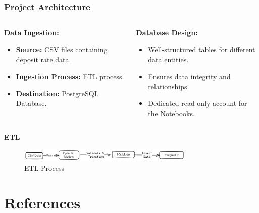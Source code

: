 \documentclass{beamer}
\begin{document}
\begin{frame}
\frametitle{Project Architecture}
 \begin{columns}[t]
    \begin{column}{0.5\textwidth}
      \textbf{Data Ingestion:}

      \begin{itemize}
        \item \textbf{Source:} CSV files containing deposit rate data.
        \item \textbf{Ingestion Process:} ETL process.
        \item \textbf{Destination:} PostgreSQL Database.
      \end{itemize}

      \vspace{1em}

      
    \end{column}

    \begin{column}{0.5\textwidth}
      \textbf{Database Design:}

      \begin{itemize}
        \item Well-structured tables for different data entities.
        \item Ensures data integrity and relationships.
        \item Dedicated read-only account for the Notebooks.
      \end{itemize}
    \end{column}
  \end{columns}

\textbf{ETL}
\begin{figure}
    \centering
    \includegraphics[width=0.75\textwidth]{reports/figures/ingestion_pipline.png}
    \caption{ETL Process}
  \end{figure}
\end{frame}

\section{References}
\begin{frame}
\printbibliography[heading=none] 
\end{frame}
\end{document}
